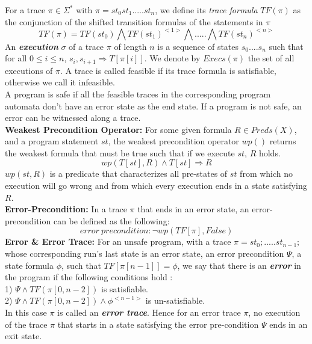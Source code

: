 \documentclass{article}
\begin{document}
For a trace $\pi \in \Sigma^*$ with $\pi = st_0st_1.....st_n$, we define its \textit{trace formula} $TF(\pi)$ as the conjunction of the shifted transition formulas of the statements in $\pi$
$$TF(\pi) = TF(st_0) \bigwedge TF(st_1)^{<1>} \bigwedge ..... \bigwedge TF(st_n)^{<n>}$$
An \textit{\textbf{execution}} $\sigma$ of a trace $\pi$ of length $n$ is a sequence of states $s_0....s_n$ such that for all $0 \leq i \leq n$, $s_i,s_{i+1} \Rightarrow T[\pi[i]]$. We denote by $Execs(\pi)$ the set of all executions of $\pi$.
A trace is called feasible if its trace formula is satisfiable, otherwise we call it infeasible. \\
A program is safe if all the feasible traces in the corresponding program automata don’t have an error state as the end state. If a program is not safe, an error can be witnessed along a trace.\\
\textbf{Weakest Precondition Operator:} For some given formula $R \in Preds(X)$, and a program statement $st$, the weakest precondition operator $wp()$ returns the weakest formula that must be true such that if we execute $st$, $R$ holds. 
$$wp(T[st],R) \wedge T[st] \Rightarrow R$$
$wp(st,R)$ is a predicate that characterizes all pre-states of $st$ from which no execution will go wrong and from which every execution ends in a state satisfying $R$.\\
\textbf{Error-Precondition:} In a trace $\pi$ that ends in an error state, an error-precondition can be defined as the following:
$$error\ precondition:\neg wp(TF[\pi],False)$$
\textbf{Error \& Error Trace: }For an unsafe program, with a trace $\pi = st_0;.....st_{n-1};$ whose corresponding run's last state is an error state, an error precondition $\Psi$, a state formula $\phi$, such that $TF[\pi[n-1]]=\phi$, we say that there is an \textbf{\textit{error}} in the program if the following conditions hold :\\
1) $\Psi \wedge TF(\pi[0,n-2])$ is satisfiable.\\
2) $\Psi \wedge TF(\pi[0,n-2]) \wedge \phi^{<n-1>} $ is un-satisfiable.\\
In this case $\pi$ is called an \textbf{\textit{error trace}}. Hence for an error trace $\pi$, no execution of the trace $\pi$ that starts in a state satisfying the error pre-condition $\Psi$ ends in an exit state.\\


\newpage
\end{document}
